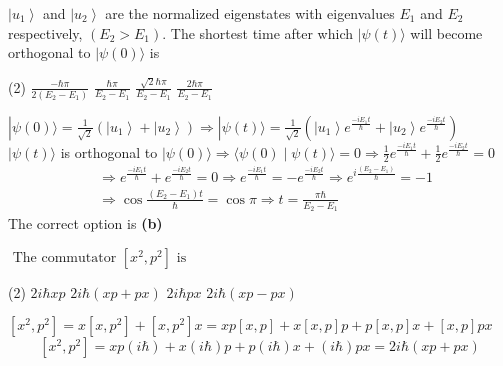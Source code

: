 \begin{enumerate}
\begin{minipage}{\textwidth}
	$\left|u_{1}\right\rangle$ and $\left|u_{2}\right\rangle$ are the normalized eigenstates with eigenvalues $E_{1}$ and $E_{2}$ respectively, $\left(E_{2}>E_{1}\right)$. The shortest time after which $|\psi(t)\rangle$ will become orthogonal to $|\psi(0)\rangle$ is
\end{minipage}
\begin{tasks}(2)
	\task[\textbf{A.}] $\frac{-\hbar \pi}{2\left(E_{2}-E_{1}\right)}$
	\task[\textbf{B.}]$\frac{\hbar \pi}{E_{2}-E_{1}}$
	\task[\textbf{C.}]$\frac{\sqrt{2} \hbar \pi}{E_{2}-E_{1}}$
	\task[\textbf{D.}]$\frac{2 \hbar \pi}{E_{2}-E_{1}}$
\end{tasks}
\begin{answer}
	$|\psi(0)\rangle=\frac{1}{\sqrt{2}}\left(\left|u_{1}\right\rangle+\left|u_{2}\right\rangle\right) \Rightarrow|\psi(t)\rangle=\frac{1}{\sqrt{2}}\left(\left|u_{1}\right\rangle e^{\frac{-i E_{1} t}{\hbar}}+\left|u_{2}\right\rangle e^{\frac{-i E_{2} t}{\hbar}}\right)$\\
	$|\psi(t)\rangle$ is orthogonal to $|\psi(0)\rangle \Rightarrow\langle\psi(0) \mid \psi(t)\rangle=0 \Rightarrow \frac{1}{2} e^{\frac{-i E_{1} t}{\hbar}}+\frac{1}{2} e^{\frac{-i E_{2} t}{\hbar}}=0$
	\begin{align*}
	&\Rightarrow e^{\frac{-i E_{1} t}{\hbar}}+e^{\frac{-i E_{2} t}{\hbar}}=0 \Rightarrow e^{\frac{-i E_{1} t}{\hbar}}=-e^{\frac{-i E_{2} t}{\hbar}} \Rightarrow e^{i \frac{\left(E_{2}-E_{1}\right)}{\hbar}}=-1 \\
	&\Rightarrow \cos \frac{\left(E_{2}-E_{1}\right) t}{\hbar}=\cos \pi \Rightarrow t=\frac{\pi \hbar}{E_{2}-E_{1}}
	\end{align*}
	The correct option is \textbf{(b)}
\end{answer}
\begin{minipage}{\textwidth}
	\item $\text { The commutator }\left[x^{2}, p^{2}\right] \text { is }$
\end{minipage}
\begin{tasks}(2)
	\task[\textbf{A.}] $2 i \hbar x p$
	\task[\textbf{B.}]$2 i \hbar(x p+p x)$
	\task[\textbf{C.}]$2 i \hbar p x$
	\task[\textbf{D.}]$2 i \hbar(x p-p x)$
\end{tasks}
\begin{answer}
$\left[x^{2}, p^{2}\right]=x\left[x, p^{2}\right]+\left[x, p^{2}\right] x=x p[x, p]+x[x, p] p+p[x, p] x+[x, p] p x$\\
$$\left[x^{2}, p^{2}\right]=x p(i \hbar)+x(i \hbar) p+p(i \hbar) x+(i \hbar) p x=2 i \hbar(x p+p x)$$

\end{answer}
\end{enumerate}
